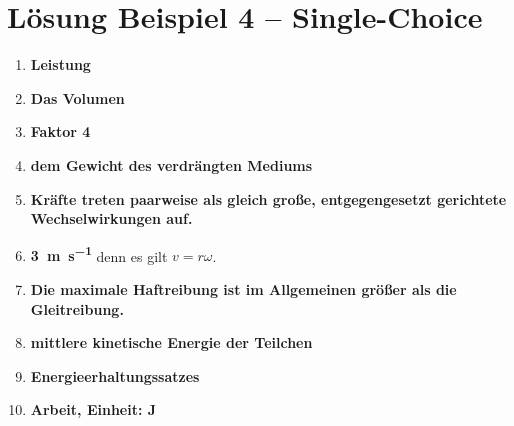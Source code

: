 \documentclass[11pt, a4paper]{article}
\begin{document}
\newpage

\section*{Lösung Beispiel 4 -- Single-Choice}
\begin{enumerate}
    \item \textbf{Leistung}
    \item \textbf{Das Volumen}
    \item \textbf{Faktor 4}
    \item \textbf{dem Gewicht des verdrängten Mediums}
    \item \textbf{Kräfte treten paarweise als gleich große, entgegengesetzt gerichtete Wechselwirkungen auf.}
    \item \textbf{\SI{3}{\metre\per\second}} \quad denn es gilt $v = r\omega$.
    \item \textbf{Die maximale Haftreibung ist im Allgemeinen größer als die Gleitreibung.}
    \item \textbf{mittlere kinetische Energie der Teilchen}
    \item \textbf{Energieerhaltungssatzes}
    \item \textbf{Arbeit, Einheit: \si{\joule}}
\end{enumerate}
\end{document}
